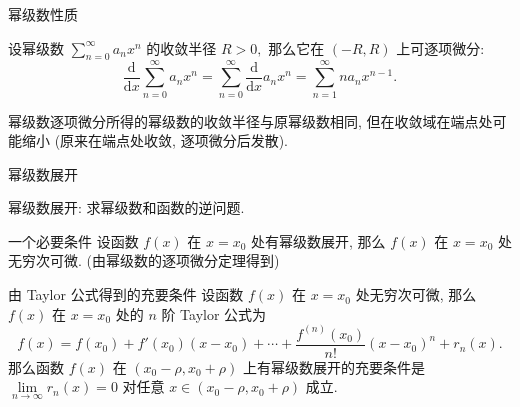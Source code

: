 \begin{frame}{幂级数性质}

\begin{thm}[逐项可微性]
设幂级数 $\sum\limits_{n=0}^\infty a_n x^n$ 的收敛半径 $R > 0,$ 那么它在 $(-R, R)$ 上可逐项微分:
\[\dfrac{\mathrm{d}}{\mathrm{d} x} \sum\limits_{n=0}^\infty a_n x^n = \sum\limits_{n=0}^\infty \dfrac{\mathrm{d}}{\mathrm{d} x} a_n x^n = \sum\limits_{n=1}^\infty n a_n x^{n-1}.\]
\end{thm}

\pause

\begin{attnblock}
幂级数逐项微分所得的幂级数的收敛半径与原幂级数相同, 但在收敛域在端点处可能缩小 (原来在端点处收敛, 逐项微分后发散).
\end{attnblock}

\end{frame}


\begin{frame}{幂级数展开}

幂级数展开: 求幂级数和函数的逆问题.

\pause

\begin{block}{一个必要条件}
设函数 $f(x)$ 在 $x = x_0$ 处有幂级数展开, 那么 $f(x)$ 在 $x = x_0$ 处无穷次可微. (由幂级数的逐项微分定理得到)
\end{block}

\pause

\begin{block}{由 Taylor 公式得到的充要条件}
设函数 $f(x)$ 在 $x = x_0$ 处无穷次可微, 那么 $f(x)$ 在 $x = x_0$ 处的 $n$ 阶 Taylor 公式为
\[f(x) = f(x_0) + f'(x_0)(x-x_0) + \cdots + \dfrac{f^{(n)}(x_0)}{n!} (x-x_0)^n + r_n(x).\]
那么函数 $f(x)$ 在 $(x_0 - \rho, x_0 + \rho)$ 上有幂级数展开的充要条件是 $\lim\limits_{n\to\infty} r_n(x) = 0$ 对任意 $x \in (x_0 - \rho, x_0 + \rho)$ 成立.
\end{block}

\end{frame}


